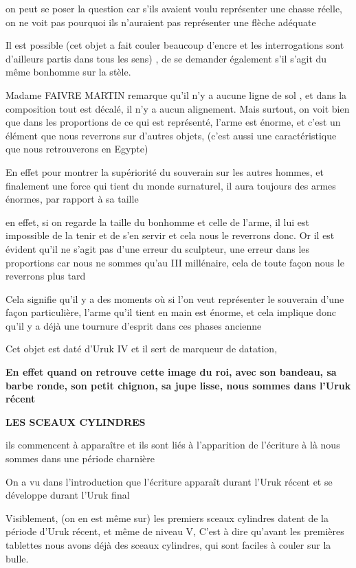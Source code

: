 \documentclass[a4paper,10pt]{article}
\begin{document}
\begin{itemize}
on peut se poser la question car s'ils avaient voulu
représenter une chasse réelle, on ne voit pas pourquoi ils
n'auraient pas représenter une flèche adéquate

Il est possible (cet objet a fait couler beaucoup
d'encre et les interrogations sont
d'ailleurs partis dans tous les  sens) , de se
demander également s'il s'agit du
même bonhomme sur la stèle.

Madame FAIVRE MARTIN remarque qu'il
n'y a aucune ligne de sol , et dans la composition
tout est décalé, il n'y a aucun alignement. Mais
surtout, on voit bien que dans les proportions de ce qui est
représenté, l'arme est énorme, et
c'est un élément que nous reverrons sur
d'autres objets,  (c'est aussi une
caractéristique que nous retrouverons en Egypte)

En effet pour montrer la supériorité du souverain sur les autres hommes,
et finalement une force qui tient du monde surnaturel, il aura toujours
des armes énormes, par rapport à sa taille 

en effet, si on regarde la taille du bonhomme et celle de
l'arme, il lui est impossible de la tenir et de
s'en servir et cela  nous le reverrons donc. Or il est
évident qu'il ne s'agit pas
d'une erreur du sculpteur, une erreur dans les
proportions car nous ne sommes qu'au III millénaire,
cela de toute façon nous le reverrons plus tard

Cela signifie qu'il y a des moments où si
l'on veut représenter le souverain
d'une façon particulière, l'arme
qu'il tient en main est énorme, et cela implique donc
qu'il y a déjà une tournure d'esprit
dans ces phases ancienne

Cet objet est daté d'Uruk IV et il sert de marqueur de
datation, 

\textbf{En effet quand on retrouve cette  image du roi, avec son
bandeau, sa barbe ronde, son petit chignon, sa jupe lisse, nous sommes
dans l'Uruk récent}

\textbf{LES SCEAUX CYLINDRES}

ils commencent à apparaître et ils sont liés à
l'apparition de l'écriture à là nous
sommes dans une période charnière

On a vu dans l'introduction que
l'écriture apparaît durant l'Uruk
récent et se développe durant l'Uruk final

Visiblement, (on en est même sur) les premiers sceaux cylindres datent
de la période d'Uruk récent, et même de niveau V,
C'est à dire qu'avant les premières
tablettes nous avons déjà des sceaux cylindres, qui sont faciles à
couler sur la bulle.


\end{itemize}
\end{document}
